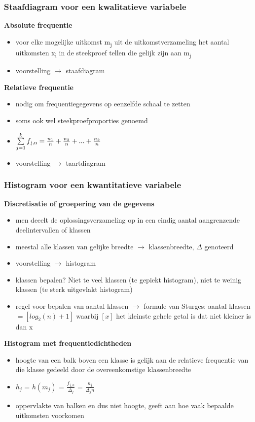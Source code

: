 \documentclass[titlepage]{article}
\numberwithin{equation}{section}
\begin{document}
\subsubsection{Staafdiagram voor een kwalitatieve variabele}
\textbf{Absolute frequentie}
\begin{itemize}
	\item voor elke mogelijke uitkomst m\textsubscript{j} uit de uitkomstverzameling het aantal uitkomsten x\textsubscript{i} in de steekproef tellen die gelijk zijn aan m\textsubscript{j}
	\item voorstelling $\rightarrow$ staafdiagram
\end{itemize}
\newpage
\textbf{Relatieve frequentie}
\begin{itemize}
	\item nodig om frequentiegegevens op eenzelfde schaal te zetten
	\item soms ook wel steekproefproporties genoemd
	\item $\sum\limits_{j=1}^k f\textsubscript{j,n} = \frac{n_{1}}{n}+\frac{n_{2}}{n}+...+\frac{n_{k}}{n}$
	\item voorstelling $\rightarrow$ taartdiagram
\end{itemize}
\subsubsection{Histogram voor een kwantitatieve variabele}
\textbf{Discretisatie of groepering van de gegevens}
\begin{itemize}
	\item men deeelt de oplossingsverzameling op in een eindig aantal aangrenzende deelintervallen of klassen
	\item meestal alle klassen van gelijke breedte $\rightarrow$ klassenbreedte, $\Delta$ genoteerd
	\item voorstelling $\rightarrow$ histogram
	\item klassen bepalen? Niet te veel klassen (te gepiekt histogram), niet te weinig klassen (te sterk uitgevlakt histogram)
	\item regel voor bepalen van aantal klassen $\rightarrow$ formule van Sturges: \newline aantal klassen $= [log_{2}(n)+1]$ waarbij $[x]$ het kleinste gehele getal is dat niet kleiner is dan x
\end{itemize}
\textbf{Histogram met frequentiedichtheden}
\begin{itemize}
	\item hoogte van een balk boven een klasse is gelijk aan de relatieve frequentie van die klasse gedeeld door de overeenkomstige klassenbreedte 
	\item $h_{j}$ = $h(m_{j})$ = $\frac{f_{j,n}}{\Delta_{j}}$ = $\frac{n_{j}}{\Delta_{j}n}$
	\item oppervlakte van balken en dus niet hoogte, geeft aan hoe vaak bepaalde uitkomsten voorkomen
\end{itemize}
\end{document}
